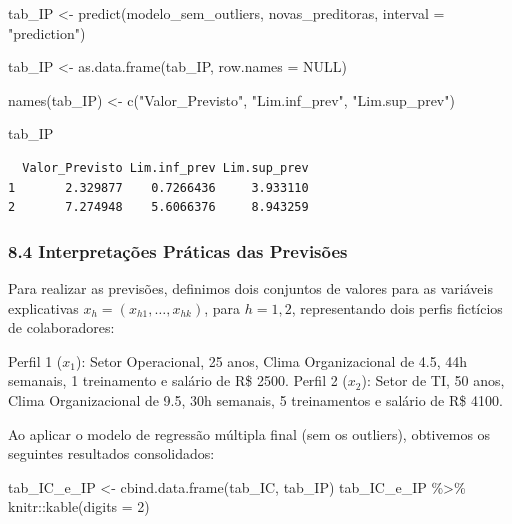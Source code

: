 \documentclass[
  letterpaper,
  DIV=11,
  numbers=noendperiod]{scrartcl}
\newenvironment{Shaded}{\begin{snugshade}}{\end{snugshade}}
\newcommand{\AttributeTok}[1]{\textcolor[rgb]{0.40,0.45,0.13}{#1}}
\newcommand{\ConstantTok}[1]{\textcolor[rgb]{0.56,0.35,0.01}{#1}}
\newcommand{\DecValTok}[1]{\textcolor[rgb]{0.68,0.00,0.00}{#1}}
\newcommand{\FunctionTok}[1]{\textcolor[rgb]{0.28,0.35,0.67}{#1}}
\newcommand{\NormalTok}[1]{\textcolor[rgb]{0.00,0.23,0.31}{#1}}
\newcommand{\OtherTok}[1]{\textcolor[rgb]{0.00,0.23,0.31}{#1}}
\newcommand{\SpecialCharTok}[1]{\textcolor[rgb]{0.37,0.37,0.37}{#1}}
\newcommand{\StringTok}[1]{\textcolor[rgb]{0.13,0.47,0.30}{#1}}
\begin{document}
\begin{Shaded}
\begin{Highlighting}[]
\NormalTok{tab\_IP }\OtherTok{\textless{}{-}} \FunctionTok{predict}\NormalTok{(modelo\_sem\_outliers, novas\_preditoras,}
                  \AttributeTok{interval =} \StringTok{"prediction"}\NormalTok{)}

\NormalTok{tab\_IP }\OtherTok{\textless{}{-}} \FunctionTok{as.data.frame}\NormalTok{(tab\_IP, }\AttributeTok{row.names =} \ConstantTok{NULL}\NormalTok{)}

\FunctionTok{names}\NormalTok{(tab\_IP) }\OtherTok{\textless{}{-}} \FunctionTok{c}\NormalTok{(}\StringTok{"Valor\_Previsto"}\NormalTok{,}
                   \StringTok{"Lim.inf\_prev"}\NormalTok{,}
                   \StringTok{"Lim.sup\_prev"}\NormalTok{)}

\NormalTok{tab\_IP}
\end{Highlighting}
\end{Shaded}

\begin{verbatim}
  Valor_Previsto Lim.inf_prev Lim.sup_prev
1       2.329877    0.7266436     3.933110
2       7.274948    5.6066376     8.943259
\end{verbatim}

\subsubsection{8.4 Interpretações Práticas das
Previsões}\label{interpretauxe7uxf5es-pruxe1ticas-das-previsuxf5es}

Para realizar as previsões, definimos dois conjuntos de valores para as
variáveis explicativas \(x_h = (x_{h1}, \dots, x_{hk})\), para
\(h = 1, 2\), representando dois perfis fictícios de colaboradores:

Perfil 1 (\(x_1\)): Setor Operacional, 25 anos, Clima Organizacional de
4.5, 44h semanais, 1 treinamento e salário de R\$ 2500. Perfil 2
(\(x_2\)): Setor de TI, 50 anos, Clima Organizacional de 9.5, 30h
semanais, 5 treinamentos e salário de R\$ 4100.

Ao aplicar o modelo de regressão múltipla final (sem os outliers),
obtivemos os seguintes resultados consolidados:

\begin{Shaded}
\begin{Highlighting}[]
\NormalTok{tab\_IC\_e\_IP }\OtherTok{\textless{}{-}} \FunctionTok{cbind.data.frame}\NormalTok{(tab\_IC, tab\_IP)}
\NormalTok{tab\_IC\_e\_IP }\SpecialCharTok{\%\textgreater{}\%}\NormalTok{ knitr}\SpecialCharTok{::}\FunctionTok{kable}\NormalTok{(}\AttributeTok{digits =} \DecValTok{2}\NormalTok{)}
\end{Highlighting}
\end{Shaded}
\end{document}
